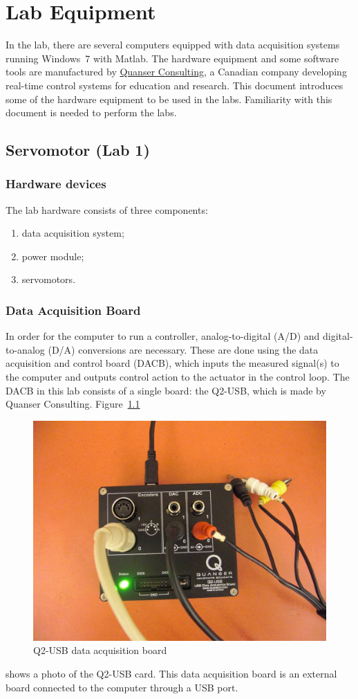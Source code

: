 \chapter{Lab Equipment}\label{chap:hardware}

In the lab, there are several computers equipped with data acquisition
systems running Windows~7 with Matlab. The hardware equipment and some
software tools are manufactured by \href{http://www.quanser.com/}{Quanser
    Consulting}, a Canadian company developing real-time control systems for
education and research. This document introduces some of the hardware
equipment to be used in the labs. Familiarity with this document is needed to
perform the labs.

\section{Servomotor (Lab 1)}
\subsection{Hardware devices}

The lab hardware consists of three components:
\begin{enumerate}
    \item data acquisition system;
    \item power module;
    \item servomotors.
\end{enumerate}

\subsection{Data Acquisition Board}

In order for the computer to run a controller, analog-to-digital (A/D) and
digital-to-analog (D/A) conversions are necessary. These are done using the
data acquisition and control board (DACB), which inputs the measured
signal(s) to the computer and outputs control action to the actuator in the %
control loop.  The DACB in this lab consists of a single board: the Q2-USB,
which is made by Quanser Consulting.  Figure~\ref{fig:q2usb}
\begin{figure}[htbp]
    \centering
    \includegraphics[width=0.6\hsize]{pix/Q2USB.jpg}
    \caption{Q2-USB data acquisition board}\label{fig:q2usb}
\end{figure}%
shows a photo of the Q2-USB card. This data acquisition board is an external
board connected to the computer through a USB port.

